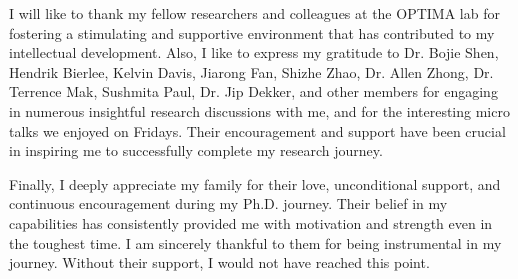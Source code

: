 I will like to thank my fellow researchers and colleagues at the OPTIMA lab for 
fostering a stimulating and supportive environment that has contributed to 
my intellectual development.
%
Also, I like to express my gratitude to Dr. Bojie Shen, Hendrik Bierlee, Kelvin Davis, Jiarong Fan,
Shizhe Zhao, Dr. Allen Zhong, Dr. Terrence Mak, Sushmita Paul, Dr. Jip Dekker, and other members for
engaging in numerous insightful research discussions with me, and for the interesting
micro talks we enjoyed on Fridays.
%
Their encouragement and support have been crucial in inspiring me to
successfully complete my research journey.

Finally, I deeply appreciate my family for their love, unconditional support, and 
continuous encouragement during my Ph.D. journey.
%
Their belief in my capabilities has consistently provided me with motivation
and strength even in the toughest time. 
%
I am sincerely thankful to them for being instrumental in my journey.
%
Without their support, I would not have reached this point.
